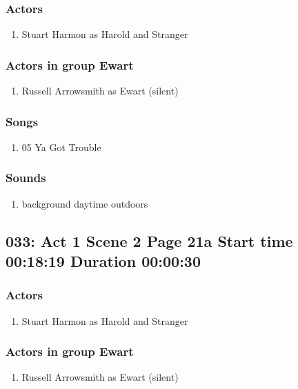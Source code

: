 \subsubsection{Actors}
\begin{enumerate}
\item Stuart Harmon as Harold and Stranger
\end{enumerate}
\subsubsection{Actors in group Ewart}
\begin{enumerate}
\item Russell Arrowsmith as Ewart (silent)
\end{enumerate}

\subsubsection{Songs}
\begin{enumerate}
\item 05 Ya Got Trouble
\end{enumerate}\subsubsection{Sounds}
\begin{enumerate}
\item background daytime outdoors
\end{enumerate}
\subsection{033: Act 1 Scene 2 Page 21a Start time 00:18:19 Duration 00:00:30}

\subsubsection{Actors}
\begin{enumerate}
\item Stuart Harmon as Harold and Stranger
\end{enumerate}
\subsubsection{Actors in group Ewart}
\begin{enumerate}
\item Russell Arrowsmith as Ewart (silent)
\end{enumerate}

